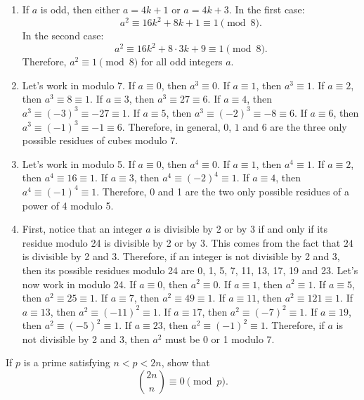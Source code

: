 \begin{solution}
    \begin{enumerate}
        \item If $a$ is odd, then either $a = 4k+1$ or $a = 4k+3$. In the first case:
        $$a^2 \equiv 16k^2 + 8k + 1 \equiv 1 \pmod 8.$$
        In the second case:
        $$a^2 \equiv 16k^2 + 8\cdot 3k + 9 \equiv 1 \pmod 8.$$
        Therefore, $a^2 \equiv 1 \pmod 8$ for all odd integers $a$.
        \item Let's work in modulo 7. If $a \equiv 0$, then $a^3 \equiv 0$. If $a \equiv 1$, then $a^3 \equiv 1$. If $a \equiv 2$, then $a^3 \equiv 8 \equiv 1$. If $a \equiv 3$, then $a^3 \equiv 27 \equiv 6$. If $a \equiv 4$, then $a^3 \equiv (-3)^3 \equiv -27 \equiv 1$. If $a \equiv 5$, then $a^3 \equiv (-2)^3 \equiv -8 \equiv 6$. If $a \equiv 6$, then $a^3 \equiv (-1)^3 \equiv -1 \equiv 6$. Therefore, in general, $0$, $1$ and $6$ are the three only possible residues of cubes modulo 7.
        \item Let's work in modulo 5. If $a \equiv 0$, then $a^4 \equiv 0$. If $a \equiv 1$, then $a^4 \equiv 1$. If $a \equiv 2$, then $a^4 \equiv 16 \equiv 1$. If $a \equiv 3$, then $a^4 \equiv (-2)^4 \equiv 1$. If $a \equiv 4$, then $a^4 \equiv (-1)^4 \equiv 1$. Therefore, 0 and 1 are the two only possible residues of a power of 4 modulo 5.
        \item First, notice that an integer $a$ is divisible by 2 or by 3 if and only if its residue modulo 24 is divisible by 2 or by 3. This comes from the fact that $24$ is divisible by 2 and 3. Therefore, if an integer is not divisible by 2 and 3, then its possible residues modulo 24 are 0, 1, 5, 7, 11, 13, 17, 19 and 23. Let's now work in modulo 24. If $a \equiv 0$, then $a^2 \equiv 0$. If $a \equiv 1$, then $a^2 \equiv 1$. If $a \equiv 5$, then $a^2 \equiv 25 \equiv 1$. If $a \equiv 7$, then $a^2 \equiv 49 \equiv 1$. If $a \equiv 11$, then $a^2 \equiv 121 \equiv 1$. If $a \equiv 13$, then $a^2 \equiv (-11)^2 \equiv 1$. If $a \equiv 17$, then $a^2 \equiv (-7)^2 \equiv 1$. If $a \equiv 19$, then $a^2 \equiv (-5)^2 \equiv 1$. If $a \equiv 23$, then $a^2 \equiv (-1)^2 \equiv 1$. Therefore, if $a$ is not divisible by 2 and 3, then $a^2$ must be 0 or 1 modulo 7.
    \end{enumerate}
\end{solution}

\begin{exercise}
    If $p$ is a prime satisfying $n < p < 2n$, show that
    $$\binom{2n}{n} \equiv 0 \pmod p.$$
\end{exercise}

